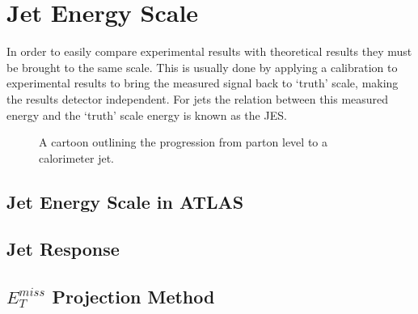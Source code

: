\chapter{Jet Energy Scale}
\label{JES}

In order to easily compare experimental results with theoretical results they must be brought to the same scale.  
This is usually done by applying a calibration to experimental results to bring the measured signal back to `truth' scale, making the results detector independent.  
For jets the relation between this measured energy and the `truth' scale energy is known as the \gls{JES}.

\begin{figure}[!ht]
  \begin{center}
  \end{center}
  \caption[Jet showering evolution.]
      {\small A cartoon outlining the progression from parton level to a calorimeter jet.}
  \label{JetLevelsFig}
\end{figure}


\section{Jet Energy Scale in ATLAS}
\label{ATLASJES}

\section{Jet Response}

\section{$E_T^{miss}$ Projection Method}
\label{METProj}


